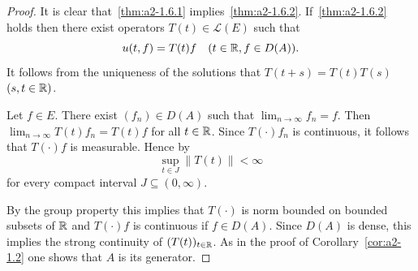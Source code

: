 \begin{proof}
It is clear that~\ref{thm:a2-1.6.1} implies~\ref{thm:a2-1.6.2}. 
If~\ref{thm:a2-1.6.2}   holds then there exist operators $T(t) \in \mathcal{L}(E)$ such that 
%
\[
	u(t,f) = T(t)f \quad (t \in \mathbb{R}, f \in D(A)) .
\]
%
It follows from the uniqueness of the solutions that $T(t+s) = T(t)T(s)$ $(s,t \in \mathbb{R})$.

Let $f \in E$. 
There exist $(f_{n}) \in D(A)$ such that $\lim_{n \to \infty} f_{n} = f$.
Then $\lim_{n \to \infty} T(t)f_{n} = T(t)f$ for all $t \in \mathbb{R}$.
Since $T(\cdot)f_{n}$ is continuous, it follows that $T(\cdot)f$ is measurable.
Hence by \textcite[10.2.1]{hillephillips:1957} 
%
\[
	\sup_{t \in J}\|T(t)\| < \infty
\]
%
for every compact interval $J \subseteq (0,\infty)$.

By the group property this implies that $T(\cdot)$ is norm bounded on bounded subsets of\/ $\mathbb{R}$ and
$T(\cdot)f$ is continuous if\/ $f \in D(A)$.
Since $D(A)$ is dense, this implies the strong continuity of\/ $(T(t))_{t \in \mathbb{R}}$.
As in the proof of Corollary~\ref{cor:a2-1.2} one shows that $A$ is its generator.
\end{proof}
